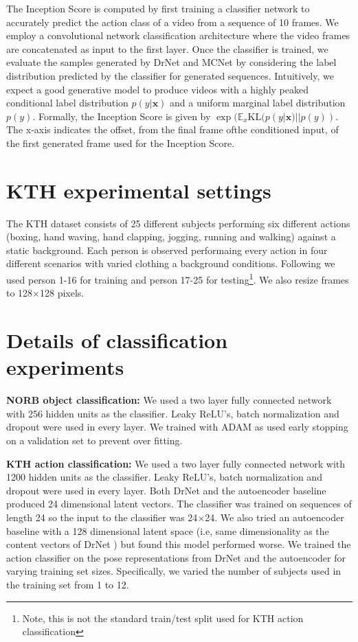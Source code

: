 \documentclass{article}
\newcommand{\fig}[1]{Fig.~\ref{fig:#1}}
\newcommand{\drnet}{{\sc DrNet} }
\begin{document}
The Inception Score is computed by first training a classifier network to
accurately predict the action class of a video from a sequence of 10 frames. We employ a convolutional network classification architecture 
where the video frames are concatenated as input to the first layer. 
Once the classifier is trained, we evaluate the samples generated by \drnet and MCNet by considering the label distribution predicted by the classifier for generated sequences.
Intuitively, we expect a good generative model to produce videos with a highly peaked conditional label distribution $p(y|\mathbf{x})$ and a uniform marginal label distribution $p(y)$. 
Formally, the Inception Score is given by $\exp(\mathbb{E}_x \text{KL}(p(y|\mathbf{x}) ||p(y))$.
The x-axis indicates the offset, from the final frame ofthe  conditioned input, of the first generated frame used for the Inception Score. 

\section{KTH experimental settings}
The KTH dataset consists of 25 different subjects performing six different actions (boxing, hand waving, hand clapping, jogging, running and walking) against a static background. Each person is observed performaing every action in four different scenarios with varied clothing a background conditions. 
Following \cite{Villegas17} we used person 1-16 for training and person 17-25 for testing\footnote{Note, this is not the standard train/test split used for KTH action classification}. We also resize frames to 128$\times$128 pixels. 

\section{Details of classification experiments}\label{sec:kth_details}\textbf{NORB object classification:} We used a two layer fully connected network with 256 hidden units as the classifier.  
Leaky ReLU's, batch normalization and dropout were used in every layer.
We trained with ADAM as used early stopping on a validation set to prevent over fitting.

\textbf{KTH action classification:} 
We used a two layer fully connected network with 1200 hidden units as the classifier.  
Leaky ReLU's, batch normalization and dropout were used in every layer.
Both \drnet and the autoencoder baseline produced 24 dimensional latent vectors.
The classifier was trained on sequences of length 24 so the input to the classifier was 24$\times$24.
We also tried an autoencoder baseline with a 128 dimensional latent space (i.e, same dimensionality as the content vectors of \drnet) but found this model performed worse.
We trained the action classifier on the pose representations from \drnet and the autoencoder for varying training set sizes. 
Specifically, we varied the number of subjects used in the training set from 1 to 12. 
\end{document}
